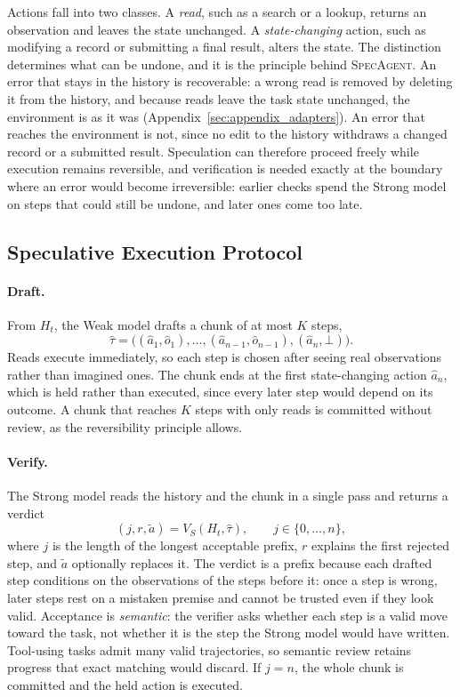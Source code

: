 \documentclass[11pt, copyright, logo, secondlogo]{template/lark}
\newcommand{\SpecAgent}{\textsc{SpecAgent}\xspace}
\begin{document}
Actions fall into two classes. A \emph{read}, such as a search or a lookup,
returns an observation and leaves the state unchanged. A
\emph{state-changing} action, such as modifying a record or submitting a
final result, alters the state. The distinction determines what can be
undone, and it is the principle behind \SpecAgent{}. An error that stays in
the history is recoverable: a wrong read is removed by deleting it from
the history, and because reads leave the task state unchanged, the environment is as it was
(Appendix~\ref{sec:appendix_adapters}). An error that reaches the environment is
not, since no edit to the history withdraws a changed record or a submitted
result. Speculation can therefore proceed freely while execution remains
reversible, and verification is needed exactly at the boundary where an
error would become irreversible: earlier checks spend the Strong model on
steps that could still be undone, and later ones come too late.

\subsection{Speculative Execution Protocol}
\label{sec:method_protocol}

\paragraph{Draft.}
From $H_t$, the Weak model drafts a chunk of at most $K$ steps,
\begin{equation}
\hat\tau=\bigl((\hat a_1,\hat o_1),\ldots,(\hat a_{n-1},\hat o_{n-1}),
(\hat a_n,\bot)\bigr).
\label{eq:candidate}
\end{equation}
Reads execute immediately, so each step is chosen after seeing real
observations rather than imagined ones. The chunk ends at the first
state-changing action $\hat a_n$, which is held rather than executed, since
every later step would depend on its outcome. A chunk that reaches $K$ steps
with only reads is committed without review, as the reversibility principle
allows.

\paragraph{Verify.}
The Strong model reads the history and the chunk in a single pass and
returns a verdict
\begin{equation}
(j,r,\tilde a)=V_S(H_t,\hat\tau), \qquad j\in\{0,\ldots,n\},
\label{eq:verification}
\end{equation}
where $j$ is the length of the longest acceptable prefix, $r$ explains the
first rejected step, and $\tilde a$ optionally replaces it. The verdict is a
prefix because each drafted step conditions on the observations of the steps
before it: once a step is wrong, later steps rest on a mistaken premise and
cannot be trusted even if they look valid. Acceptance is
\emph{semantic}: the verifier asks whether each step is a valid move toward
the task, not whether it is the step the Strong model would have written.
Tool-using tasks admit many valid trajectories, so semantic review retains
progress that exact matching would discard. If $j=n$, the whole chunk is
committed and the held action is executed.
\end{document}
